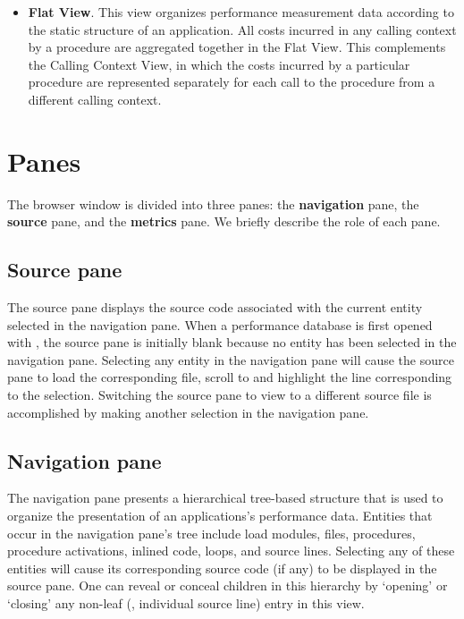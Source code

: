 \begin{itemize}
\item \textbf{Flat View}. This view organizes performance measurement data according to the static structure of an application. All costs incurred in any calling context by a procedure are aggregated together in the Flat View. This complements the Calling Context View, in which the costs incurred by a particular procedure are represented separately for each call to the procedure from a different calling context.

\end{itemize}



\section{Panes}

The browser window is divided into three panes: the \textbf{navigation} pane, the \textbf{source} pane, and the \textbf{metrics} pane. We briefly describe the role of each pane.


\subsection{Source pane} The source pane displays the source code associated with the current entity selected in the navigation pane. When a performance database is first opened with \hpcviewer{}, the source pane is initially blank because no entity has been selected in the navigation pane. Selecting any entity in the navigation pane will cause the source pane to load the corresponding file, scroll to and highlight the line corresponding to the selection. Switching the source pane to view to a different source file is accomplished by making another selection in the navigation pane.


\subsection{Navigation pane} The navigation pane presents a hierarchical tree-based structure that is used to organize the presentation of an applications's performance data. Entities that occur in the navigation pane's tree include load modules, files, procedures, procedure activations, inlined code, loops, and source lines. Selecting any of these entities will cause its corresponding source code (if any) to be displayed in the source pane. One can reveal or conceal children in this hierarchy by `opening' or `closing' any non-leaf (\ie{}, individual source line) entry in this view.

